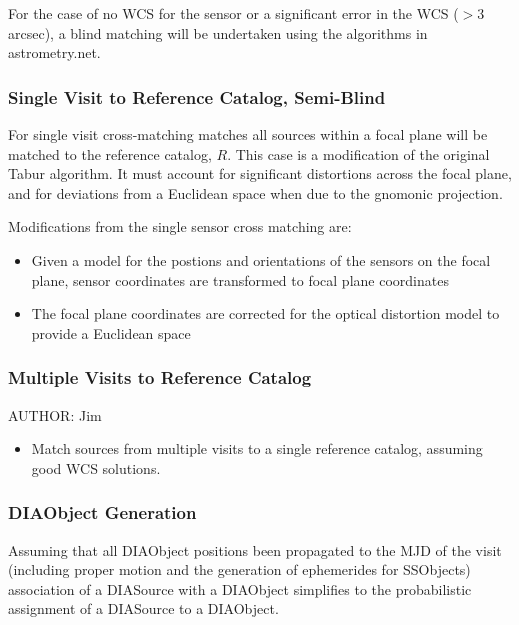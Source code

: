 For the case of no WCS for the sensor or a significant error in the
WCS ($> 3$ arcsec), a blind matching will be undertaken using the
algorithms in astrometry.net. 

\subsubsection{Single Visit to Reference Catalog, Semi-Blind}
\label{sec:acSingleVisitReferenceMatching}

For single visit cross-matching matches all sources within a focal
plane will be matched to the reference catalog, $R$. This case is a
modification of the original Tabur algorithm. It must account for 
significant distortions across the focal plane, and for deviations from a Euclidean space when due to the gnomonic projection.

Modifications from the single sensor cross matching are:
\begin{itemize}
\item Given a model for the postions and orientations of the sensors
  on the focal plane, sensor coordinates are transformed to focal plane
  coordinates 
\item The focal plane coordinates are corrected for the optical distortion model to provide a Euclidean space
\end{itemize}





\subsubsection{Multiple Visits to Reference Catalog}
\label{sec:acJointCalMatching}
AUTHOR: Jim
\begin{itemize}
\item Match sources from multiple visits to a single reference catalog, assuming good WCS solutions.
\end{itemize}

\subsubsection{DIAObject Generation}
\label{sec:acDIAObjectGeneration}

Assuming that all DIAObject positions been propagated to the MJD of
the visit (including proper motion and the generation of ephemerides
for SSObjects) association of a DIASource with a DIAObject simplifies
to the probabilistic assignment of a DIASource to a DIAObject.

